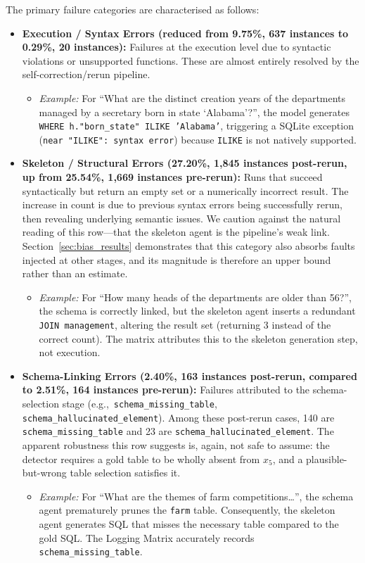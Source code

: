 \documentclass[conference]{IEEEtran}
\begin{document}
The primary failure categories are characterised as follows:

\begin{itemize}
  \item \textbf{Execution / Syntax Errors (reduced from 9.75\%, 637 instances to 0.29\%, 20 instances):} Failures at the execution level due to syntactic violations or unsupported functions. These are almost entirely resolved by the self-correction/rerun pipeline.
  \begin{itemize}
    \item \emph{Example:} For ``What are the distinct creation years of the departments managed by a secretary born in state `Alabama'?'', the model generates \texttt{WHERE h."born\_state" ILIKE 'Alabama'}, triggering a SQLite exception (\texttt{near "ILIKE": syntax error}) because \texttt{ILIKE} is not natively supported.
  \end{itemize}

  \item \textbf{Skeleton / Structural Errors (27.20\%, 1{,}845 instances post-rerun, up from 25.54\%, 1{,}669 instances pre-rerun):} Runs that succeed syntactically but return an empty set or a numerically incorrect result. The increase in count is due to previous syntax errors being successfully rerun, then revealing underlying semantic issues. We caution against the natural reading of this row---that the skeleton agent is the pipeline's weak link. Section~\ref{sec:bias_results} demonstrates that this category also absorbs faults injected at other stages, and its magnitude is therefore an upper bound rather than an estimate.
  \begin{itemize}
    \item \emph{Example:} For ``How many heads of the departments are older than 56?'', the schema is correctly linked, but the skeleton agent inserts a redundant \texttt{JOIN management}, altering the result set (returning 3 instead of the correct count). The matrix attributes this to the skeleton generation step, not execution.
  \end{itemize}

  \item \textbf{Schema-Linking Errors (2.40\%, 163 instances post-rerun, compared to 2.51\%, 164 instances pre-rerun):} Failures attributed to the schema-selection stage (e.g.,~\texttt{schema\_missing\_table}, \texttt{schema\_hallucinated\_element}). Among these post-rerun cases, 140 are \texttt{schema\_missing\_table} and 23 are \texttt{schema\_hallucinated\_element}. The apparent robustness this row suggests is, again, not safe to assume: the detector requires a gold table to be wholly absent from $x_5$, and a plausible-but-wrong table selection satisfies it.
  \begin{itemize}
    \item \emph{Example:} For ``What are the themes of farm competitions\ldots'', the schema agent prematurely prunes the \texttt{farm} table. Consequently, the skeleton agent generates SQL that misses the necessary table compared to the gold SQL. The Logging Matrix accurately records \texttt{schema\_missing\_table}.
  \end{itemize}


\end{itemize}
\end{document}
